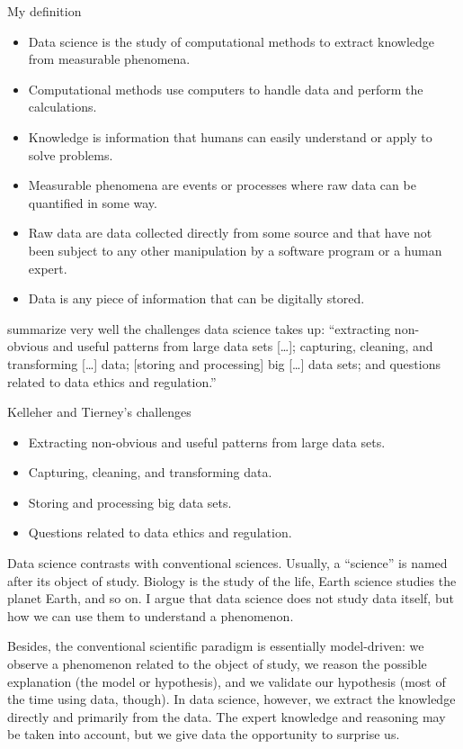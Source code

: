 \begin{slidebox}{My definition}{}
  \begin{itemize}
    \item Data science is the study of computational methods to extract knowledge from
      measurable phenomena.
    \item Computational methods use computers to handle data and perform the calculations.
    \item Knowledge is information that humans can easily understand or apply to solve
      problems.
    \item Measurable phenomena are events or processes where raw data can be quantified
      in some way.
    \item Raw data are data collected directly from some source and that have not been
      subject to any other manipulation by a software program or a human expert.
    \item Data is any piece of information that can be digitally stored.
  \end{itemize}
\end{slidebox}

\textcite{Kelleher2018} summarize very well the challenges data science takes up:
``extracting non-obvious and useful patterns from large data sets [\dots]; capturing,
cleaning, and transforming [\dots] data; [storing and processing] big [\dots] data sets;
and questions related to data ethics and regulation.''

\begin{slidebox}{Kelleher and Tierney's challenges}{}
  \begin{itemize}
    \item Extracting non-obvious and useful patterns from large data sets.
    \item Capturing, cleaning, and transforming data.
    \item Storing and processing big data sets.
    \item Questions related to data ethics and regulation.
  \end{itemize}
\end{slidebox}

Data science contrasts with conventional sciences.  Usually, a ``science'' is named after
its object of study.  Biology is the study of the life, Earth science studies the planet
Earth, and so on.  I argue that data science does not study data itself, but how we can
use them to understand a phenomenon.

Besides, the conventional scientific paradigm is
essentially model-driven: we observe a phenomenon related to the object of study, we
reason the possible explanation (the model or hypothesis), and we validate our hypothesis
(most of the time using data, though).  In data science, however, we extract the knowledge
directly and primarily from the data.  The expert knowledge and reasoning may be taken
into account, but we give data the opportunity to surprise us.

